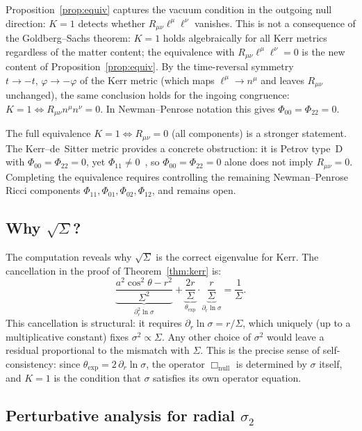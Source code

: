 \documentclass{iopart}
\begin{document}
\noindent
Proposition~\ref{prop:equiv} captures the vacuum condition
in the outgoing null direction: $K{=}1$ detects whether
$R_{\mu\nu}\ell^\mu\ell^\nu$ vanishes.
This is not a consequence of the Goldberg--Sachs theorem:
$K{=}1$ holds algebraically for all Kerr metrics regardless
of the matter content; the equivalence with
$R_{\mu\nu}\ell^\mu\ell^\nu=0$ is the new content of
Proposition~\ref{prop:equiv}.
By the time-reversal symmetry $t\to -t,\,\varphi\to -\varphi$
of the Kerr metric (which maps $\ell^\mu\to n^\mu$ and leaves
$R_{\mu\nu}$ unchanged), the same conclusion holds for the
ingoing congruence: $K{=}1\Leftrightarrow R_{\mu\nu}n^\mu n^\nu=0$.
In Newman--Penrose notation this gives
$\Phi_{00}=\Phi_{22}=0$.

The full equivalence $K{=}1\Leftrightarrow R_{\mu\nu}=0$
(all components) is a stronger statement.
The Kerr--de~Sitter metric provides a concrete obstruction:
it is Petrov type~D with $\Phi_{00}=\Phi_{22}=0$, yet
$\Phi_{11}\neq 0$~\cite[Sec.~57]{Chandrasekhar1983},
so $\Phi_{00}=\Phi_{22}=0$
alone does not imply $R_{\mu\nu}=0$.
Completing the equivalence requires controlling the
remaining Newman--Penrose Ricci components
$\Phi_{11},\Phi_{01},\Phi_{02},\Phi_{12}$, and remains open.

\subsection*{Why $\sqrt{\Sigma}$?}

The computation reveals why $\sqrt{\Sigma}$ is the correct
eigenvalue for Kerr.
The cancellation in the proof of Theorem~\ref{thm:kerr} is:
\[
  \underbrace{\frac{a^2\cos^2\!\theta-r^2}{\Sigma^2}}_{\partial_r^2\ln\sigma}
  +\underbrace{\frac{2r}{\Sigma}}_{\theta_{\mathrm{exp}}}
  \cdot\underbrace{\frac{r}{\Sigma}}_{\partial_r\ln\sigma}
  =\frac{1}{\Sigma}.
\]
This cancellation is structural: it requires
$\partial_r\ln\sigma=r/\Sigma$, which uniquely (up to a
multiplicative constant) fixes $\sigma^2\propto\Sigma$.
Any other choice of $\sigma^2$ would leave a residual
proportional to the mismatch with $\Sigma$.
This is the precise sense of self-consistency: since
$\theta_{\mathrm{exp}}=2\,\partial_r\ln\sigma$, the operator
$\Box_{\mathrm{null}}$ is determined by $\sigma$ itself,
and $K{=}1$ is the condition that $\sigma$ satisfies its
own operator equation.

\subsection*{Perturbative analysis for radial $\sigma_2$}
\end{document}

